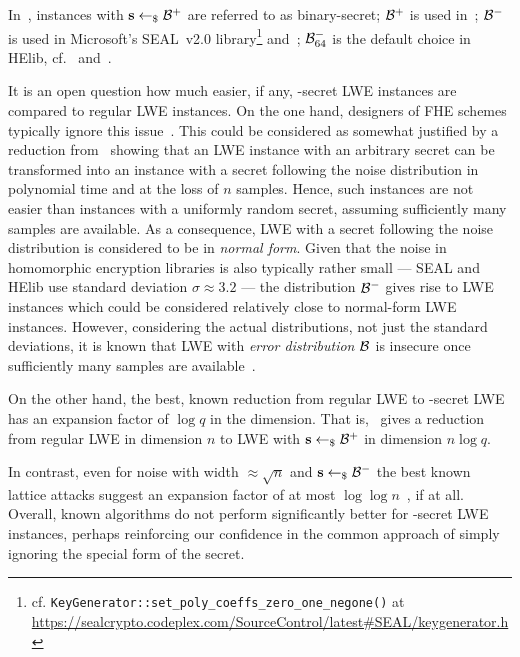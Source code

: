 \documentclass[a4paper]{llncs}
\begin{document}
\begin{remark}
  In~\cite{STOC:BLPRS13}, instances with \(\s \sample \B{+}\) are referred to as binary-secret; \(\B{+}\) is used in~\cite{EPRINT:FanVer12}; \(\B{-}\) is used in Microsoft's SEAL~v2.0 library\footnote{cf. \lstinline{KeyGenerator::set_poly_coeffs_zero_one_negone()} at \url{https://sealcrypto.codeplex.com/SourceControl/latest#SEAL/keygenerator.h}} and~\cite{AFRICACRYPT:LepNae14}; \(\B[64]{-}\) is the default choice in HElib, cf.~\cite[Appendix C.1.1]{EPRINT:GenHalSma12} and~\cite{C:HalSho14}.
\end{remark}

It is an open question how much easier, if any, \B{}-secret LWE instances are compared to regular LWE instances. On the one hand, designers of FHE schemes typically ignore this issue~\cite{C:GenHalSma12,AFRICACRYPT:LepNae14,RSA:CosSma16}. This could be considered as somewhat justified by a reduction from~\cite{C:ACPS09} showing that an LWE instance with an arbitrary secret can be transformed into an instance with a secret following the noise distribution in polynomial time and at the loss of $n$ samples. Hence, such instances are not easier than instances with a uniformly random secret, assuming sufficiently many samples are available. As a consequence, LWE with a secret following the noise distribution is considered to be in \emph{normal form}. Given that the noise in homomorphic encryption libraries is also typically rather small --- SEAL and HElib use standard deviation $σ ≈ 3.2$ --- the distribution $ \B{-}$ gives rise to LWE instances which could be considered relatively close to normal-form LWE instances. However, considering the actual distributions, not just the standard deviations, it is known that LWE with \emph{error distribution} \(\B{}\) is insecure once sufficiently many samples are available~\cite{ICALP:AroGe11,EPRINT:ACFP14,C:KirFou15}.

On the other hand, the best, known reduction from regular LWE to \B{+}-secret LWE has an expansion factor of $\log q$ in the dimension. That is,~\cite{STOC:BLPRS13} gives a reduction from regular LWE in dimension $n$ to LWE with \(\s \sample \B{+}\) in dimension \(n \log q\).

In contrast, even for noise with width $≈\sqrt{n}$ and $\s \sample \B{-}$ the best known lattice attacks suggest an expansion factor of at most \(\log\log n\)~\cite{ACISP:BaiGal14}, if at all. Overall, known algorithms do not perform significantly better for \B{}-secret LWE instances, perhaps reinforcing our confidence in the common approach of simply ignoring the special form of the secret.
\end{document}

